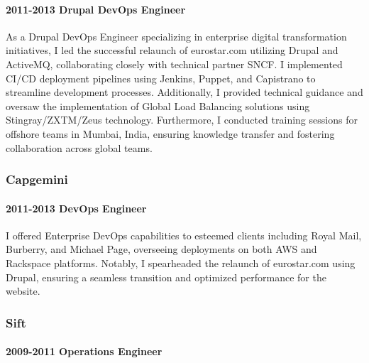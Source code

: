 \documentclass[
]{article}
\begin{document}
\hypertarget{drupal-devops-engineer}{%
\paragraph{2011-2013 Drupal DevOps
Engineer}\label{drupal-devops-engineer}}

As a Drupal DevOps Engineer specializing in enterprise digital
transformation initiatives, I led the successful relaunch of
eurostar.com utilizing Drupal and ActiveMQ, collaborating closely with
technical partner SNCF. I implemented CI/CD deployment pipelines using
Jenkins, Puppet, and Capistrano to streamline development processes.
Additionally, I provided technical guidance and oversaw the
implementation of Global Load Balancing solutions using
Stingray/ZXTM/Zeus technology. Furthermore, I conducted training
sessions for offshore teams in Mumbai, India, ensuring knowledge
transfer and fostering collaboration across global teams.

\hypertarget{material-office-building-capgemini}{%
\subsubsection{\texorpdfstring{\faBuilding
Capgemini}{ Capgemini}}\label{material-office-building-capgemini}}

\hypertarget{devops-engineer-1}{%
\paragraph{2011-2013 DevOps Engineer}\label{devops-engineer-1}}

I offered Enterprise DevOps capabilities to esteemed clients including
Royal Mail, Burberry, and Michael Page, overseeing deployments on both
AWS and Rackspace platforms. Notably, I spearheaded the relaunch of
eurostar.com using Drupal, ensuring a seamless transition and optimized
performance for the website.

\hypertarget{material-office-building-sift}{%
\subsubsection{\texorpdfstring{\faBuilding
Sift}{ Sift}}\label{material-office-building-sift}}

\hypertarget{operations-engineer-1}{%
\paragraph{2009-2011 Operations Engineer}\label{operations-engineer-1}}
\end{document}
